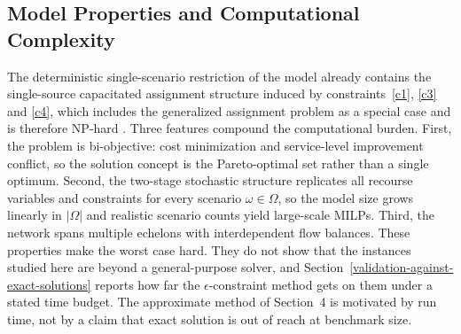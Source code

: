 \documentclass[11pt, a4paper]{article}
\begin{document}
\subsection{Model Properties and Computational Complexity}
\label{model-properties-and-computational-complexity}
The deterministic single-scenario restriction of the model already contains the single-source capacitated assignment structure induced by constraints~\ref{c1}, \ref{c3} and \ref{c4}, which includes the generalized assignment problem as a special case and is therefore NP-hard \citep{Garey, wolsey1998integer}. Three features compound the computational burden. First, the problem is bi-objective: cost minimization and service-level improvement conflict, so the solution concept is the Pareto-optimal set rather than a single optimum. Second, the two-stage stochastic structure replicates all recourse variables and constraints for every scenario $\omega \in \Omega$, so the model size grows linearly in $|\Omega|$ and realistic scenario counts yield large-scale MILPs. Third, the network spans multiple echelons with interdependent flow balances. These properties make the worst case hard. They do not show that the instances studied here are beyond a general-purpose solver, and Section~\ref{validation-against-exact-solutions} reports how far the $\epsilon$-constraint method gets on them under a stated time budget. The approximate method of Section~4 is motivated by run time, not by a claim that exact solution is out of reach at benchmark size.
\end{document}
